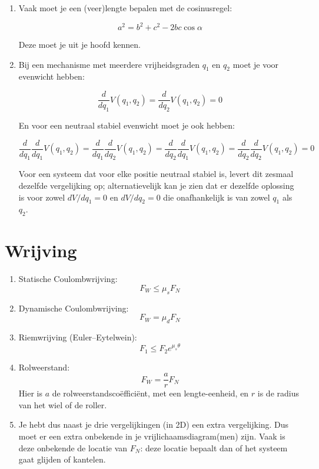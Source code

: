 \documentclass{article}
\begin{document}
\begin{enumerate}
\item Vaak moet je een (veer)lengte bepalen met de cosinusregel:

$$a^2 = b^2 + c^2 -2bc\cos\alpha$$

Deze moet je uit je hoofd kennen.

\item Bij een mechanisme met meerdere vrijheidsgraden $q_1$ en $q_2$ moet je voor evenwicht hebben:

$$\frac{d}{dq_1}V(q_1,q_2) = \frac{d}{dq_2}V(q_1,q_2) = 0 $$

En voor een neutraal stabiel evenwicht moet je ook hebben:

$$\frac{d}{dq_1}\frac{d}{dq_1} V(q_1,q_2) = \frac{d}{dq_1} \frac{d}{dq_2}V(q_1,q_2) = \frac{d}{dq_2} \frac{d}{dq_1}V(q_1,q_2) = \frac{d}{dq_2} \frac{d}{dq_2}V(q_1,q_2) = 0 $$

Voor een systeem dat voor elke positie neutraal stabiel is, levert dit zesmaal dezelfde vergelijking op; alternatievelijk kan je zien dat er dezelfde oplossing is voor zowel $dV/dq_1=0$ en $dV/dq_2=0$ die onafhankelijk is van zowel $q_1$ als $q_2$.

\end{enumerate}




\section{Wrijving}

\begin{enumerate}
    \item Statische Coulombwrijving:
$$F_W \leq \mu_s F_N$$

\item Dynamische Coulombwrijving:
$$F_W = \mu_d F_N$$

\item Riemwrijving (Euler–Eytelwein):
$$F_{1} \leq F_{2} e^{\mu_s \theta}$$

\item Rolweerstand:
$$F_W = \frac{a}{r} F_N$$
Hier is $a$ de rolweerstandscoëfficiënt, met een lengte-eenheid, en $r$ is de radius van het wiel of de roller. 

\item Je hebt dus naast je drie vergelijkingen (in 2D) een extra vergelijking. Dus moet er een extra onbekende in je vrijlichaamsdiagram(men) zijn. Vaak is deze onbekende de locatie van $F_N$: deze locatie bepaalt dan of het systeem gaat glijden of kantelen.
\end{enumerate}
\end{document}
